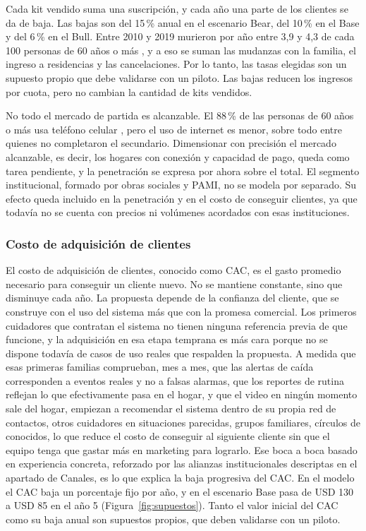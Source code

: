 Cada kit vendido suma una suscripción, y cada año una parte de los clientes se da de baja.
Las bajas son del 15\,\% anual en el escenario Bear, del 10\,\% en el Base y del 6\,\% en el Bull.
Entre 2010 y 2019 murieron por año entre 3,9 y 4,3 de cada 100 personas de 60 años o más \parencite{MinSalud2021}, y a eso se suman las mudanzas con la familia, el ingreso a residencias y las cancelaciones.
Por lo tanto, las tasas elegidas son un supuesto propio que debe validarse con un piloto.
Las bajas reducen los ingresos por cuota, pero no cambian la cantidad de kits vendidos.

No todo el mercado de partida es alcanzable.
El 88\,\% de las personas de 60 años o más usa teléfono celular \parencite{INDEC2025}, pero el uso de internet es menor, sobre todo entre quienes no completaron el secundario.
Dimensionar con precisión el mercado alcanzable, es decir, los hogares con conexión y capacidad de pago, queda como tarea pendiente, y la penetración se expresa por ahora sobre el total.
El segmento institucional, formado por obras sociales y PAMI, no se modela por separado.
Su efecto queda incluido en la penetración y en el costo de conseguir clientes, ya que todavía no se cuenta con precios ni volúmenes acordados con esas instituciones.

\subsubsection{Costo de adquisición de clientes}
\label{sec:cac}

El costo de adquisición de clientes, conocido como CAC, es el gasto promedio necesario para conseguir un cliente nuevo.
No se mantiene constante, sino que disminuye cada año.
La propuesta depende de la confianza del cliente, que se construye con el uso del sistema más que con la promesa comercial.
Los primeros cuidadores que contratan el sistema no tienen ninguna referencia previa de que funcione, y la adquisición en esa etapa temprana es más cara porque no se dispone todavía de casos de uso reales que respalden la propuesta.
A medida que esas primeras familias comprueban, mes a mes, que las alertas de caída corresponden a eventos reales y no a falsas alarmas, que los reportes de rutina reflejan lo que efectivamente pasa en el hogar, y que el video en ningún momento sale del hogar, empiezan a recomendar el sistema dentro de su propia red de contactos, otros cuidadores en situaciones parecidas, grupos familiares, círculos de conocidos, lo que reduce el costo de conseguir al siguiente cliente sin que el equipo tenga que gastar más en marketing para lograrlo.
Ese boca a boca basado en experiencia concreta, reforzado por las alianzas institucionales descriptas en el apartado de Canales, es lo que explica la baja progresiva del CAC.
En el modelo el CAC baja un porcentaje fijo por año, y en el escenario Base pasa de USD 130 a USD 85 en el año 5 (Figura~\ref{fig:supuestos}).
Tanto el valor inicial del CAC como su baja anual son supuestos propios, que deben validarse con un piloto.

